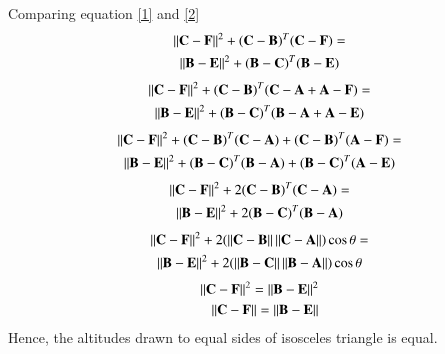 \documentclass[journal,12pt,twocolumn]{IEEEtran}
\begin{document}
 Comparing equation \eqref{1} and \eqref{2}
\begin{multline}
\left\lVert\mathbf{C-F}\right\rVert^2+\mathbf{(C-B)}^T\mathbf{(C-F)}=\\\left\lVert\mathbf{B-E}\right\rVert^2+\mathbf{(B-C)}^T\mathbf{(B-E)}
\end{multline}
\begin{multline}
\left\lVert\mathbf{C-F}\right\rVert^2+\mathbf{(C-B)}^T\mathbf{(C-A+A-F)}=\\
\left\lVert\mathbf{B-E}\right\rVert^2+\mathbf{(B-C)}^T\mathbf{(B-A+A-E)}
\end{multline}
\begin{multline}
\left\lVert\mathbf{C-F}\right\rVert^2+\mathbf{(C-B)}^T\mathbf{(C-A)}+\mathbf{(C-B)}^T\mathbf{(A-F)}=\\
\left\lVert\mathbf{B-E}\right\rVert^2+\mathbf{(B-C)}^T\mathbf{(B-A)}+\mathbf{(B-C)}^T\mathbf{(A-E)}
\end{multline}
\begin{multline}
\left\lVert\mathbf{C-F}\right\rVert^2+2\mathbf{(C-B)}^T\mathbf{(C-A)}=\\
\left\lVert\mathbf{B-E}\right\rVert^2+2\mathbf{(B-C)}^T\mathbf{(B-A)}
\end{multline}
\begin{multline}
\left\lVert\mathbf{C-F}\right\rVert^2+2(\left\lVert\mathbf{C-B}\right\rVert\left\lVert\mathbf{C-A}\right\rVert)\cos\theta=\\
\left\lVert\mathbf{B-E}\right\rVert^2+2(\left\lVert\mathbf{B-C}\right\rVert\left\lVert\mathbf{B-A}\right\rVert)\cos\theta
\end{multline}
\begin{align}
\left\lVert\mathbf{C-F}\right\rVert^2=\left\lVert\mathbf{B-E}\right\rVert^2\\
\left\lVert\mathbf{C-F}\right\rVert=\left\lVert\mathbf{B-E}\right\rVert
\end{align}
Hence, the altitudes drawn to equal sides of isosceles triangle is equal.
 
\end{document}
